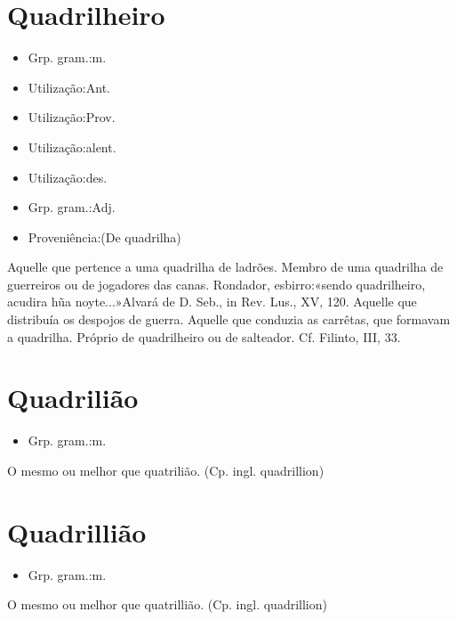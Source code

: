 \section{Quadrilheiro}
\begin{itemize}
\item {Grp. gram.:m.}
\end{itemize}
\begin{itemize}
\item {Utilização:Ant.}
\end{itemize}
\begin{itemize}
\item {Utilização:Prov.}
\end{itemize}
\begin{itemize}
\item {Utilização:alent.}
\end{itemize}
\begin{itemize}
\item {Utilização:des.}
\end{itemize}
\begin{itemize}
\item {Grp. gram.:Adj.}
\end{itemize}
\begin{itemize}
\item {Proveniência:(De \textunderscore quadrilha\textunderscore )}
\end{itemize}
Aquelle que pertence a uma quadrilha de ladrões.
Membro de uma quadrilha de guerreiros ou de jogadores das canas.
Rondador, esbirro:«\textunderscore sendo quadrilheiro, acudira hũa noyte...\textunderscore »\textunderscore Alvará de D. Seb.\textunderscore , in \textunderscore Rev. Lus.\textunderscore , XV, 120.
Aquelle que distribuía os despojos de guerra.
Aquelle que conduzia as carrêtas, que formavam a quadrilha.
Próprio de quadrilheiro ou de salteador. Cf. Filinto, III, 33.
\section{Quadrilião}
\begin{itemize}
\item {Grp. gram.:m.}
\end{itemize}
O mesmo ou melhor que \textunderscore quatrilião\textunderscore .
(Cp. ingl. \textunderscore quadrillion\textunderscore )
\section{Quadrillião}
\begin{itemize}
\item {Grp. gram.:m.}
\end{itemize}
O mesmo ou melhor que \textunderscore quatrillião\textunderscore .
(Cp. ingl. \textunderscore quadrillion\textunderscore )
